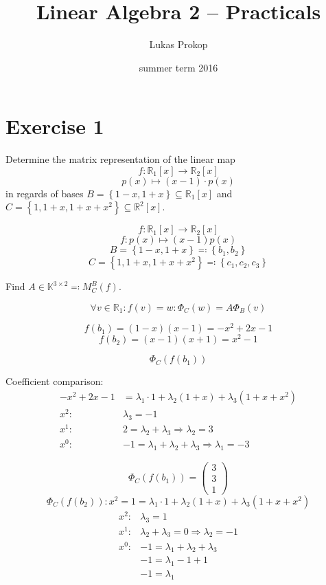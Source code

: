 \documentclass[a4paper]{article}
\title{Linear Algebra 2 -- Practicals}
\author{Lukas Prokop}
\date{summer term 2016}
\theoremstyle{definition}
\newcommand\set[1]{\left\{#1\right\}}
\begin{document}
\maketitle
\tableofcontents

\clearpage
\section{Exercise 1}
\begin{ex}
  Determine the matrix representation of the linear map
  \[ f: \mathbb R_1[x] \to \mathbb R_2[x] \]
  \[ p(x) \mapsto (x-1) \cdot p(x) \]
  in regards of bases $B = \set{1-x, 1+x} \subseteq \mathbb R_1[x]$ and $C = \set{1, 1 + x, 1 + x + x^2} \subseteq \mathbb R^2[x]$.
\end{ex}

\[
  f: \mathbb R_1[x] \to \mathbb R_2[x]
\] \[
  f: p(x) \mapsto (x-1) p(x)
\] \[
  B = \set{1-x, 1+x} \eqqcolon \set{b_1, b_2}
\] \[
  C = \set{1, 1+x, 1+x+x^2} \eqqcolon \set{c_1, c_2, c_3}
\]

Find $A \in \mathbb K^{3\times 2} \eqqcolon M_C^B(f)$.

\[ \forall v \in \mathbb R_1: f(v) = w : \Phi_C(w) = A \Phi_B(v) \]

\[ f(b_1) = (1-x)(x-1) = -x^2 + 2x - 1 \]
\[ f(b_2) = (x-1)(x+1) = x^2 - 1 \]

\[ \Phi_C(f(b_1)) \]

Coefficient comparison:
\begin{align*}
  -x^2 + 2x - 1 &= \lambda_1 \cdot 1 + \lambda_2 (1 + x) + \lambda_3 (1 + x + x^2) \\
  x^2: & \lambda_3 = -1 \\
  x^1: & 2 = \lambda_2 + \lambda_3 \Rightarrow \lambda_2 = 3 \\
  x^0: & -1 = \lambda_1 + \lambda_2 + \lambda_3 \Rightarrow \lambda_1 = -3
\end{align*}

\[ \Phi_C(f(b_1)) = \begin{pmatrix} 3 \\ 3 \\ 1 \end{pmatrix} \]
\[ \Phi_C(f(b_2)): x^2 = 1 = \lambda_1 \cdot 1 + \lambda_2 (1 + x) + \lambda_3 (1 + x + x^2) \]
\begin{align*}
  x^2: & \lambda_3 = 1 \\
  x^1: & \lambda_2 + \lambda_3 = 0 \Rightarrow \lambda_2 = -1 \\
  x^0: & -1 = \lambda_1 + \lambda_2 + \lambda_3 \\
       & -1 = \lambda_1 - 1 + 1 \\
       & -1 = \lambda_1
\end{align*}
\end{document}
